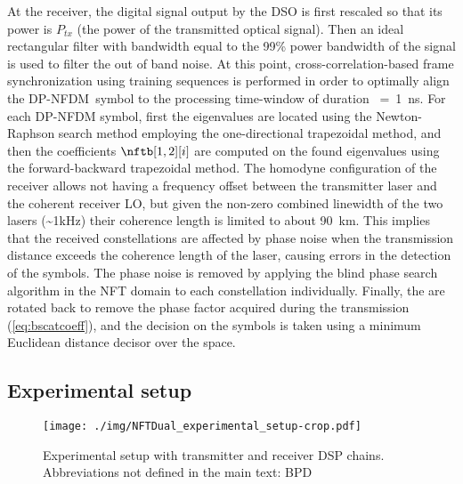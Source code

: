 At the receiver, the digital signal output by the \ac{DSO} is first rescaled so that its power is $P_{tx}$ (the power of the transmitted optical signal). Then an ideal rectangular filter with bandwidth equal to the 99\% power bandwidth of the signal is used to filter the out of band noise.
At this point, cross-correlation-based
frame synchronization using training sequences is performed in order
to optimally align the \ac{DP-NFDM}~symbol to the processing time-window of duration \mbox{\Ts{} = \SI{1}{\ns}}.
For each \ac{DP-NFDM} symbol, first the eigenvalues are
located using the Newton-Raphson search method employing the one-directional trapezoidal method, and then the coefficients $\nftb[1,2][i]$
are computed on the found eigenvalues using the forward-backward trapezoidal  method. The homodyne configuration of the receiver allows not having a frequency offset between the transmitter laser and the coherent receiver \ac{LO}, but given the non-zero combined linewidth of the two lasers (\textasciitilde 1kHz) their coherence length is limited to about \SI{90}{\km}. This implies that the received constellations are affected by phase noise when the transmission distance exceeds the coherence length of the laser, causing errors in the detection of the symbols. The phase noise is removed by applying the blind phase search algorithm \cite{Pfau:09} in the \ac{NFT} domain to each constellation individually.
Finally, the \scatcoef{} are rotated back to remove the phase factor acquired during the transmission (\eqref{eq:bscatcoeff}), and the decision on the symbols is taken using a minimum Euclidean distance decisor over the \scatcoef{} space.


\subsection{Experimental setup}\label{experimental-setup}

\begin{figure}[!t]
  \centering
  \texttt{[image: ./img/NFTDual\_experimental\_setup-crop.pdf]}
  \caption{Experimental setup with transmitter and receiver \acs{DSP} chains. Abbreviations not defined in the main text: \ac{BPD}}
  \label{fig:dp_nfdm_setup}
\end{figure}


